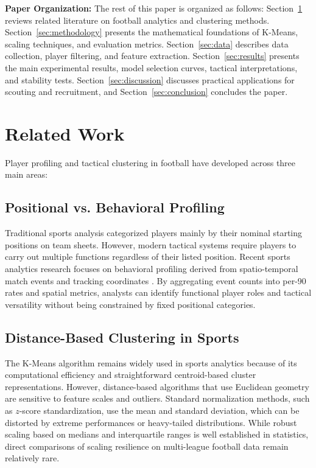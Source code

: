 \documentclass[12pt]{ai_conquer2026}
\begin{document}
\textbf{Paper Organization:} The rest of this paper is organized as follows: Section~\ref{sec:related_work} reviews related literature on football analytics and clustering methods. Section~\ref{sec:methodology} presents the mathematical foundations of K-Means, scaling techniques, and evaluation metrics. Section~\ref{sec:data} describes data collection, player filtering, and feature extraction. Section~\ref{sec:results} presents the main experimental results, model selection curves, tactical interpretations, and stability tests. Section~\ref{sec:discussion} discusses practical applications for scouting and recruitment, and Section~\ref{sec:conclusion} concludes the paper.

\section{Related Work}
\label{sec:related_work}

Player profiling and tactical clustering in football have developed across three main areas:

\subsection{Positional vs. Behavioral Profiling}
Traditional sports analysis categorized players mainly by their nominal starting positions on team sheets. However, modern tactical systems require players to carry out multiple functions regardless of their listed position. Recent sports analytics research focuses on behavioral profiling derived from spatio-temporal match events and tracking coordinates \cite{pappalardo2019public}. By aggregating event counts into per-90 rates and spatial metrics, analysts can identify functional player roles and tactical versatility without being constrained by fixed positional categories.

\subsection{Distance-Based Clustering in Sports}
The K-Means algorithm \cite{macqueen1967methods} remains widely used in sports analytics because of its computational efficiency and straightforward centroid-based cluster representations. However, distance-based algorithms that use Euclidean geometry are sensitive to feature scales and outliers. Standard normalization methods, such as $z$-score standardization, use the mean and standard deviation, which can be distorted by extreme performances or heavy-tailed distributions. While robust scaling based on medians and interquartile ranges is well established in statistics, direct comparisons of scaling resilience on multi-league football data remain relatively rare.
\end{document}
